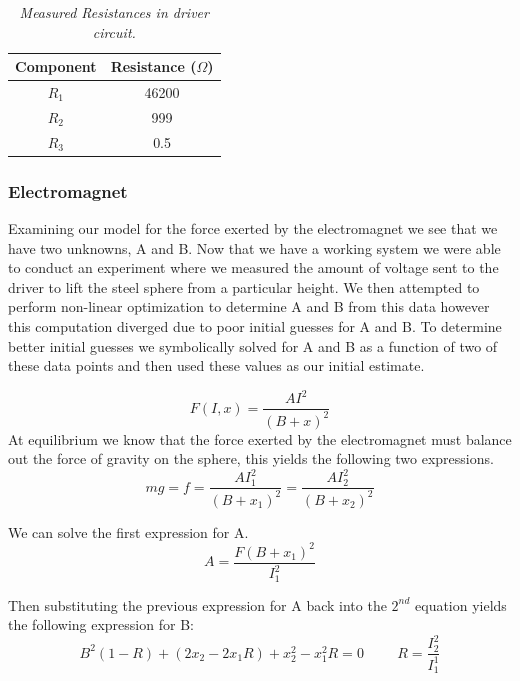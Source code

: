 \documentclass{article}
\theoremstyle{plain}
\theoremstyle{definition}
\theoremstyle{remark}
\begin{document}
\begin{table}
\begin{center}
    \begin{tabular}{|c|c|}
        \hline
        Component & Resistance ($\Omega$) \\ \hline
        $R_{1}$   & 46200                 \\ 
        $R_{2}$   & 999                   \\ 
        $R_{3}$   & 0.5                   \\
        \hline
    \end{tabular}
\caption{\emph{Measured Resistances in driver circuit.}}
\label{Q1_dt1}
\end{center}
\end{table}

\subsubsection*{Electromagnet}
Examining our model for the force exerted by the electromagnet we see that we have two unknowns, A and B.  Now that we have a working system we were able to conduct an experiment where we measured the amount of voltage sent to the driver to lift the steel sphere from a particular height.  We then attempted to perform non-linear optimization to determine A and B from this data however this computation diverged due to poor initial guesses for A and B.  To determine better initial guesses we symbolically solved for A and B as a function of two of these data points and then used these values as our initial estimate.  

$$ F(I,x) = \frac{A I^2}{(B+x)^2} $$
At equilibrium we know that the force exerted by the electromagnet must balance out the force of gravity on the sphere, this yields the following two expressions.
$$ mg = f = \frac{A I_{1}^2}{(B+x_{1})^2}  = \frac{A I_{2}^2}{(B+x_{2})^2} $$ 

We can solve the first expression for A.
$$ A = \frac{F (B + x_{1})^2}{I_{1}^2}$$

Then substituting the previous expression for A back into the $2^{nd}$ equation yields the following expression for B:
$$ B^2(1-R) + (2x_2-2x_1R)+x_2^2-x_1^2R = 0 \hspace{1cm} R = \frac{I_2^2}{I_1^1} $$
\end{document}
